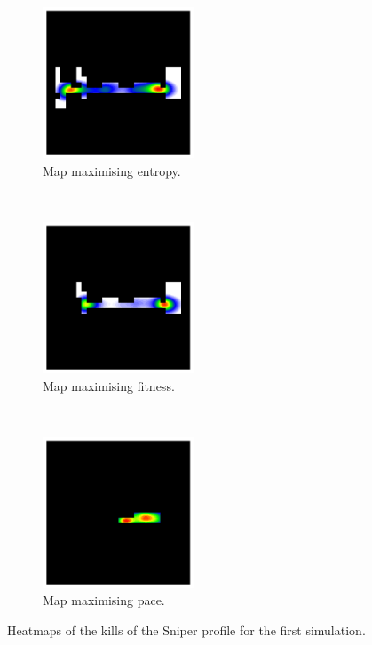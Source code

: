 \begin{figure}[H]
    \centering
    \begin{subfigure}[t]{0.3\textwidth}
        \centering
        \includegraphics[height=4.5cm]{Images/images/experiment_one/best_entropy_pop_0/kills_bot_1.png}
        \caption{Map maximising entropy.}
    \end{subfigure}%
    ~ 
    \begin{subfigure}[t]{0.3\textwidth}
        \centering
        \includegraphics[height=4.5cm]{Images/images/experiment_one/best_fitness_pop_0/kills_bot_1.png}
        \caption{Map maximising fitness.}
    \end{subfigure}
    ~ 
    \begin{subfigure}[t]{0.3\textwidth}
        \centering
        \includegraphics[height=4.5cm]{Images/images/experiment_one/best_pace_pop_0/kills_bot_1.png}
        \caption{Map maximising pace.}
    \end{subfigure}
    \caption{Heatmaps of the kills of the Sniper profile for the first simulation.}
\end{figure}
